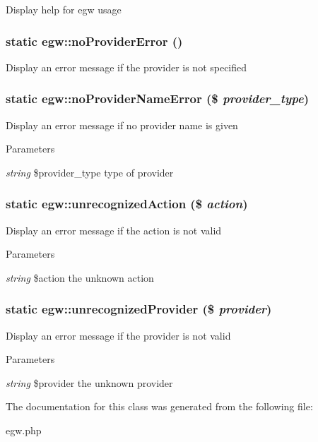 \label{classegw_ac70cba8b05c8c26992fc0d88593ee619}
Display help for egw usage \hypertarget{classegw_a094de8a99539ed16bfcfa02cca96ebe6}{
\subsubsection[{noProviderError}]{\setlength{\rightskip}{0pt plus 5cm}static egw::noProviderError ()}}
\label{classegw_a094de8a99539ed16bfcfa02cca96ebe6}
Display an error message if the provider is not specified \hypertarget{classegw_abdbb7004acfd7445fc6a09e9cfe5f325}{
\subsubsection[{noProviderNameError}]{\setlength{\rightskip}{0pt plus 5cm}static egw::noProviderNameError (\$ {\em provider\_\-type})}}
\label{classegw_abdbb7004acfd7445fc6a09e9cfe5f325}
Display an error message if no provider name is given 
\begin{DoxyParams}{Parameters}
\item[{\em string}]\$provider\_\-type type of provider \end{DoxyParams}
\hypertarget{classegw_ab244791d7a1e0e3ea56698a3330e6193}{
\subsubsection[{unrecognizedAction}]{\setlength{\rightskip}{0pt plus 5cm}static egw::unrecognizedAction (\$ {\em action})}}
\label{classegw_ab244791d7a1e0e3ea56698a3330e6193}
Display an error message if the action is not valid 
\begin{DoxyParams}{Parameters}
\item[{\em string}]\$action the unknown action \end{DoxyParams}
\hypertarget{classegw_ae6db8538d2c1211717b469b8b6d6b916}{
\subsubsection[{unrecognizedProvider}]{\setlength{\rightskip}{0pt plus 5cm}static egw::unrecognizedProvider (\$ {\em provider})}}
\label{classegw_ae6db8538d2c1211717b469b8b6d6b916}
Display an error message if the provider is not valid 
\begin{DoxyParams}{Parameters}
\item[{\em string}]\$provider the unknown provider \end{DoxyParams}


The documentation for this class was generated from the following file:\begin{DoxyCompactItemize}
\item 
egw.php\end{DoxyCompactItemize}
